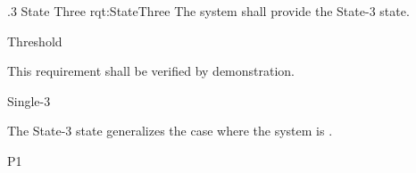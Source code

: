\ONERQMTV
{\RqtNumberBase.3}
{State Three}
{rqt:StateThree}
{The system shall provide the State-3 state.}
{
	\item [Phase 1] Threshold
}
{This requirement shall be verified by demonstration.}
{
	\item [\cite{ref__KNEAD_Manual}] Single-3
}
{
	\item The State-3 state generalizes the case where the system is \TBD.
}
{P1}




